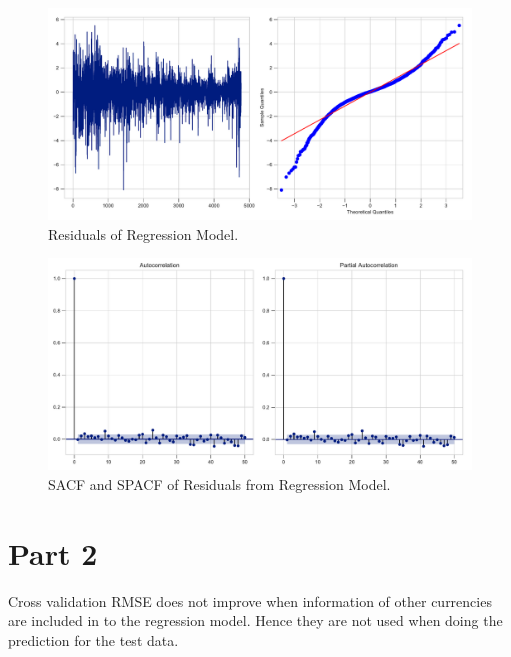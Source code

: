 \documentclass[]{article}
\begin{document}
%
\begin{figure}[hbtp]
	\centering
	\includegraphics[width=1\columnwidth]{../Figures/res_after_reg.pdf}
	\caption{Residuals of Regression Model.}
	\label{fig:res_after_reg}
\end{figure}
%
%
\begin{figure}[hbtp]
	\centering
	\includegraphics[width=1\columnwidth]{../Figures/sacf_n_spacf_after_reg.pdf}
	\caption{SACF and SPACF of Residuals from Regression Model.}
	\label{fig:sacf_n_spacf_after_reg}
\end{figure}
%

\section{Part 2}
Cross validation RMSE does not improve when information of other currencies are included in to the regression model. Hence they are not used when doing the prediction for the test data.
\end{document}
